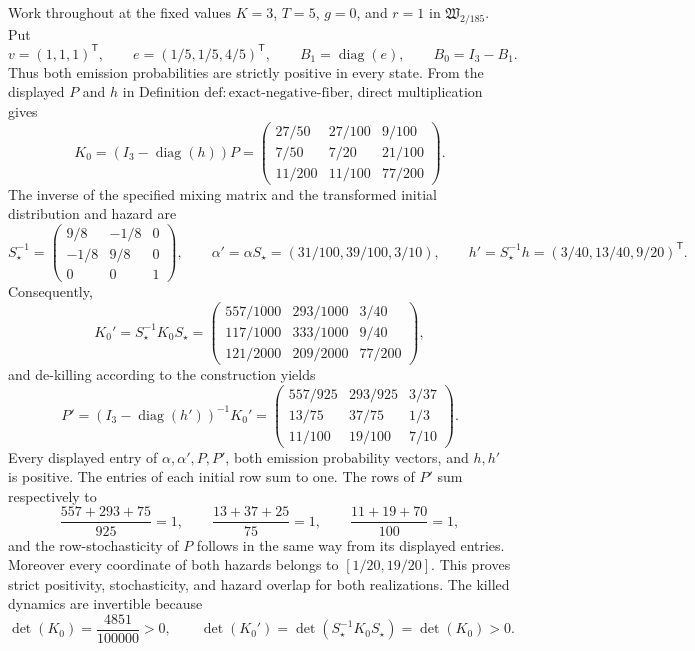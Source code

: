 Work throughout at the fixed values \(K=3\), \(T=5\), \(g=0\), and \(r=1\) in \(\mathfrak W_{2/185}\).  Put
\[
 v=(1,1,1)^{\mathsf T},\qquad
 e=(1/5,1/5,4/5)^{\mathsf T},\qquad
 B_1=\operatorname{diag}(e),\qquad B_0=I_3-B_1.
\]
Thus both emission probabilities are strictly positive in every state.  From the displayed \(P\) and \(h\) in Definition \(\mathrm{def{:}exact\text{-}negative\text{-}fiber}\), direct multiplication gives
\[
 K_0=(I_3-\operatorname{diag}(h))P
 =\begin{pmatrix}
 27/50&27/100&9/100\\
 7/50&7/20&21/100\\
 11/200&11/100&77/200
 \end{pmatrix}.
\]
The inverse of the specified mixing matrix and the transformed initial distribution and hazard are
\[
 S_{\star}^{-1}
 =\begin{pmatrix}9/8&-1/8&0\\-1/8&9/8&0\\0&0&1\end{pmatrix},
 \qquad
 \alpha'=\alpha S_{\star}=(31/100,39/100,3/10),
 \qquad
 h'=S_{\star}^{-1}h=(3/40,13/40,9/20)^{\mathsf T}.
\]
Consequently,
\[
 K_0'=S_{\star}^{-1}K_0S_{\star}
 =\begin{pmatrix}
 557/1000&293/1000&3/40\\
 117/1000&333/1000&9/40\\
 121/2000&209/2000&77/200
 \end{pmatrix},
\]
and de-killing according to the construction yields
\[
 P'=(I_3-\operatorname{diag}(h'))^{-1}K_0'
 =\begin{pmatrix}
 557/925&293/925&3/37\\
 13/75&37/75&1/3\\
 11/100&19/100&7/10
 \end{pmatrix}.
\]
Every displayed entry of \(\alpha,\alpha',P,P'\), both emission probability vectors, and \(h,h'\) is positive.  The entries of each initial row sum to one.  The rows of \(P'\) sum respectively to
\[
 \frac{557+293+75}{925}=1,\qquad
 \frac{13+37+25}{75}=1,\qquad
 \frac{11+19+70}{100}=1,
\]
and the row-stochasticity of \(P\) follows in the same way from its displayed entries.  Moreover every coordinate of both hazards belongs to \([1/20,19/20]\).  This proves strict positivity, stochasticity, and hazard overlap for both realizations.  The killed dynamics are invertible because
\[
 \det(K_0)=\frac{4851}{100000}>0,
 \qquad
 \det(K_0')=\det(S_{\star}^{-1}K_0S_{\star})
 =\det(K_0)>0.
\]

